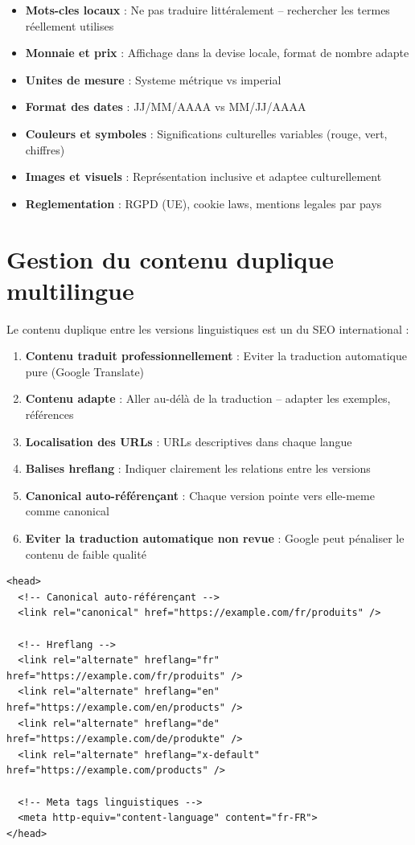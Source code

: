 \begin{itemize}
    \item \textbf{Mots-cles locaux} : Ne pas traduire littéralement -- rechercher les termes réellement utilises
    \item \textbf{Monnaie et prix} : Affichage dans la devise locale, format de nombre adapte
    \item \textbf{Unites de mesure} : Systeme métrique vs imperial
    \item \textbf{Format des dates} : JJ/MM/AAAA vs MM/JJ/AAAA
    \item \textbf{Couleurs et symboles} : Significations culturelles variables (rouge, vert, chiffres)
    \item \textbf{Images et visuels} : Représentation inclusive et adaptee culturellement
    \item \textbf{Reglementation} : RGPD (UE), cookie laws, mentions legales par pays
\end{itemize}

\section{Gestion du contenu duplique multilingue}

Le contenu duplique entre les versions linguistiques est un  du SEO international :

\begin{enumerate}
    \item \textbf{Contenu traduit professionnellement} : Eviter la traduction automatique pure (Google Translate)
    \item \textbf{Contenu adapte} : Aller au-délà de la traduction -- adapter les exemples, références
    \item \textbf{Localisation des URLs} : URLs descriptives dans chaque langue
    \item \textbf{Balises hreflang} : Indiquer clairement les relations entre les versions
    \item \textbf{Canonical auto-référençant} : Chaque version pointe vers elle-meme comme canonical
    \item \textbf{Eviter la traduction automatique non revue} : Google peut pénaliser le contenu de faible qualité
\end{enumerate}

\begin{lstlisting}[style=htmlcode,caption={Canonical et hreflang combines correctement}]
<head>
  <!-- Canonical auto-référençant -->
  <link rel="canonical" href="https://example.com/fr/produits" />

  <!-- Hreflang -->
  <link rel="alternate" hreflang="fr" href="https://example.com/fr/produits" />
  <link rel="alternate" hreflang="en" href="https://example.com/en/products" />
  <link rel="alternate" hreflang="de" href="https://example.com/de/produkte" />
  <link rel="alternate" hreflang="x-default" href="https://example.com/products" />

  <!-- Meta tags linguistiques -->
  <meta http-equiv="content-language" content="fr-FR">
</head>
\end{lstlisting}

